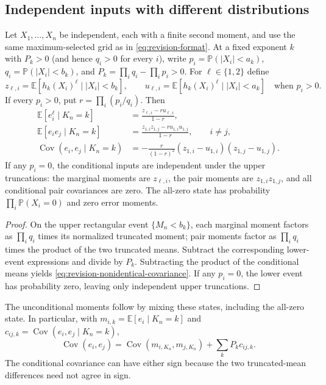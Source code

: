 \subsection{Independent inputs with different distributions}
\label{sec:nonidentical}

\begin{proposition}
\label{prop:revision-nonidentical}
Let $X_1,\ldots,X_n$ be independent, each with a finite second moment, and
use the same maximum-selected grid as in \eqref{eq:revision-format}. At a
fixed exponent $k$ with $P_k>0$ (and hence $q_i>0$ for every $i$), write
$p_i=\mathbb P(|X_i|<a_k)$,
$q_i=\mathbb P(|X_i|<b_k)$, and
$P_k=\prod_iq_i-\prod_ip_i>0$. For $\ell\in\{1,2\}$ define
\[
 z_{\ell,i}=\mathbb E[h_k(X_i)^\ell\mid |X_i|<b_k],\qquad
 u_{\ell,i}=\mathbb E[h_k(X_i)^\ell\mid |X_i|<a_k]
 \quad\text{when }p_i>0.
\]
If every $p_i>0$, put $r=\prod_i(p_i/q_i)$. Then
\begin{align}
 \mathbb E[e_i^\ell\mid K_n=k]
   &=\frac{z_{\ell,i}-r u_{\ell,i}}{1-r},
       \label{eq:revision-nonidentical-marginal}\\
 \mathbb E[e_ie_j\mid K_n=k]
   &=\frac{z_{1,i}z_{1,j}-r u_{1,i}u_{1,j}}{1-r},\qquad i\ne j,
       \label{eq:revision-nonidentical-pair}\\
 \operatorname{Cov}(e_i,e_j\mid K_n=k)
   &=-\frac{r}{(1-r)^2}
       (z_{1,i}-u_{1,i})(z_{1,j}-u_{1,j}).
       \label{eq:revision-nonidentical-covariance}
\end{align}
If any $p_i=0$, the conditional inputs are independent under the upper
truncations: the marginal moments are $z_{\ell,i}$, the pair moments are
$z_{1,i}z_{1,j}$, and all conditional pair covariances are zero.
The all-zero state has probability $\prod_i\mathbb P(X_i=0)$ and zero
error moments.
\end{proposition}

\begin{proof}
On the upper rectangular event $\{M_n<b_k\}$, each marginal moment factors
as $\prod_iq_i$ times its normalized truncated moment; pair moments factor
as $\prod_iq_i$ times the product of the two truncated means. Subtract the
corresponding lower-event expressions and divide by $P_k$. Subtracting
the product of the conditional means yields
\eqref{eq:revision-nonidentical-covariance}. If any $p_i=0$, the lower
event has probability zero, leaving only independent upper truncations.
\end{proof}

The unconditional moments follow by mixing these states, including the
all-zero state. In particular, with
$m_{i,k}=\mathbb E[e_i\mid K_n=k]$ and
$c_{ij,k}=\operatorname{Cov}(e_i,e_j\mid K_n=k)$,
\[
 \operatorname{Cov}(e_i,e_j)
 =\operatorname{Cov}(m_{i,K_n},m_{j,K_n})+\sum_kP_kc_{ij,k}.
\]
The conditional covariance can have either sign because the two
truncated-mean differences need not agree in sign.

